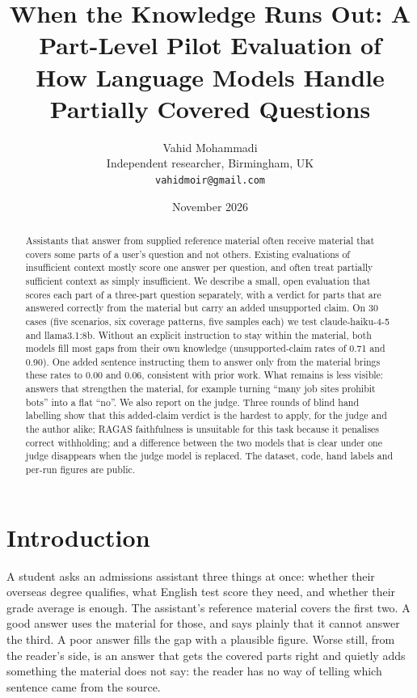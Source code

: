 \documentclass[11pt]{article}
\title{When the Knowledge Runs Out: A Part-Level Pilot Evaluation of\\How Language Models Handle Partially Covered Questions}
\author{Vahid Mohammadi\\\small Independent researcher, Birmingham, UK\\\small \texttt{vahidmoir@gmail.com}}
\date{November 2026}
\begin{document}
\maketitle

\begin{abstract}
Assistants that answer from supplied reference material often receive material that covers some parts of a user's question and not others. Existing evaluations of insufficient context mostly score one answer per question, and often treat partially sufficient context as simply insufficient. We describe a small, open evaluation that scores each part of a three-part question separately, with a verdict for parts that are answered correctly from the material but carry an added unsupported claim. On 30 cases (five scenarios, six coverage patterns, five samples each) we test claude-haiku-4-5 and llama3.1:8b. Without an explicit instruction to stay within the material, both models fill most gaps from their own knowledge (unsupported-claim rates of 0.71 and 0.90). One added sentence instructing them to answer only from the material brings these rates to 0.00 and 0.06, consistent with prior work. What remains is less visible: answers that strengthen the material, for example turning ``many job sites prohibit bots'' into a flat ``no''. We also report on the judge. Three rounds of blind hand labelling show that this added-claim verdict is the hardest to apply, for the judge and the author alike; RAGAS faithfulness is unsuitable for this task because it penalises correct withholding; and a difference between the two models that is clear under one judge disappears when the judge model is replaced. The dataset, code, hand labels and per-run figures are public.
\end{abstract}

\section{Introduction}

A student asks an admissions assistant three things at once: whether their overseas degree qualifies, what English test score they need, and whether their grade average is enough. The assistant's reference material covers the first two. A good answer uses the material for those, and says plainly that it cannot answer the third. A poor answer fills the gap with a plausible figure. Worse still, from the reader's side, is an answer that gets the covered parts right and quietly adds something the material does not say: the reader has no way of telling which sentence came from the source.
\end{document}

